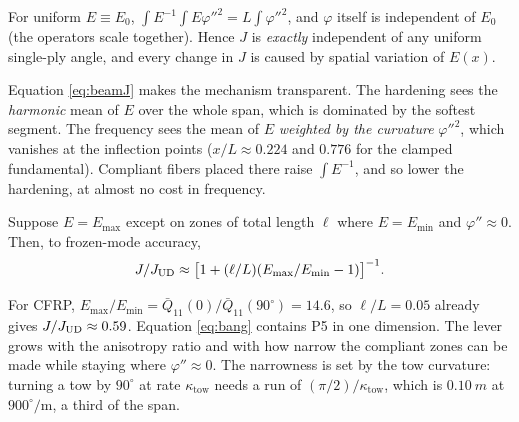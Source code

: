 \begin{corollary}\label{cor:beaminv}
For uniform $E\equiv E_0$, $\int E^{-1}\int E\varphi''^2=L\int\varphi''^2$, and $\varphi$
itself is independent of $E_0$ (the operators scale together). Hence $J$ is
\emph{exactly} independent of any uniform single-ply angle, and every change in $J$ is
caused by spatial variation of $E(x)$.
\end{corollary}

Equation \eqref{eq:beamJ} makes the mechanism transparent. The hardening sees the
\emph{harmonic} mean of $E$ over the whole span, which is dominated by the softest
segment. The frequency sees the mean of $E$ \emph{weighted by the curvature} $\varphi''^2$,
which vanishes at the inflection points ($x/L\approx0.224$ and $0.776$ for the
clamped fundamental). Compliant fibers placed there raise $\int E^{-1}$, and so lower the
hardening, at almost no cost in frequency.

\begin{corollary}\label{cor:bang}
Suppose $E=E_{\max}$ except on zones of total length $\ell$ where $E=E_{\min}$ and
$\varphi''\approx0$. Then, to frozen-mode accuracy,
\begin{equation}
J/J_{\mathrm{UD}}\approx\big[1+(\ell/L)(E_{\max}/E_{\min}-1)\big]^{-1}.
\label{eq:bang}
\end{equation}
\end{corollary}
\noindent For CFRP, $E_{\max}/E_{\min}=\bar Q_{11}(0)/\bar Q_{11}(90^\circ)=14.6$, so
$\ell/L=0.05$ already gives $J/J_{\mathrm{UD}}\approx0.59$. Equation \eqref{eq:bang} contains P5
in one dimension. The lever grows with the anisotropy ratio and with how narrow the
compliant zones can be made while staying where $\varphi''\approx0$. The narrowness is set
by the tow curvature: turning a tow by $90^\circ$ at rate $\kappa_{\mathrm{tow}}$ needs a
run of $(\pi/2)/\kappa_{\mathrm{tow}}$, which is $\SI{0.10}{m}$ at
$900^\circ/\mathrm{m}$, a third of the span.
